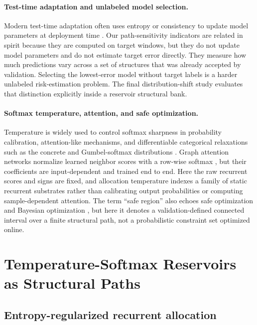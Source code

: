 \documentclass[11pt,a4paper]{article}
\begin{document}
\paragraph{Test-time adaptation and unlabeled model selection.}
Modern test-time adaptation often uses entropy or consistency to update model parameters at deployment time \citep{wang2021tent,niu2022sentry}. Our path-sensitivity indicators are related in spirit because they are computed on target windows, but they do not update model parameters and do not estimate target error directly. They measure how much predictions vary across a set of structures that was already accepted by validation. Selecting the lowest-error model without target labels is a harder unlabeled risk-estimation problem. The final distribution-shift study evaluates that distinction explicitly inside a reservoir structural bank.

\paragraph{Softmax temperature, attention, and safe optimization.}
Temperature is widely used to control softmax sharpness in probability calibration, attention-like mechanisms, and differentiable categorical relaxations such as the concrete and Gumbel-softmax distributions \citep{guo2017calibration,maddison2017concrete,jang2017categorical}. Graph attention networks normalize learned neighbor scores with a row-wise softmax \citep{velickovic2018graph}, but their coefficients are input-dependent and trained end to end. Here the raw recurrent scores and signs are fixed, and allocation temperature indexes a family of static recurrent substrates rather than calibrating output probabilities or computing sample-dependent attention. The term ``safe region'' also echoes safe optimization and Bayesian optimization \citep{snoek2012practical,sui2015safe}, but here it denotes a validation-defined connected interval over a finite structural path, not a probabilistic constraint set optimized online.

\section{Temperature-Softmax Reservoirs as Structural Paths}
\label{sec:structural_path}


\subsection{Entropy-regularized recurrent allocation}
\end{document}
